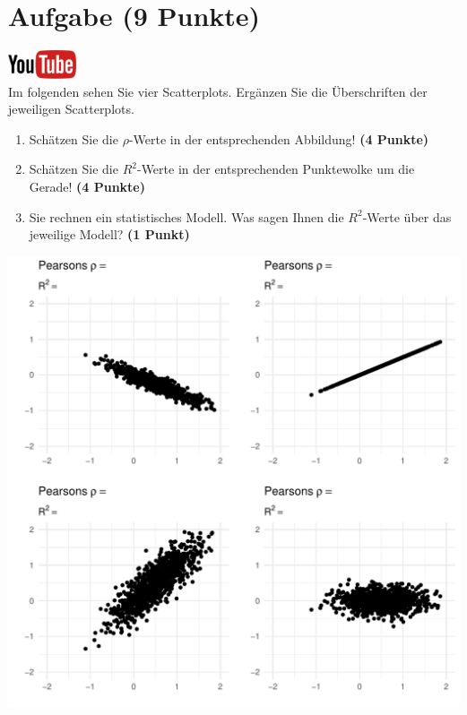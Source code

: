 \documentclass[a4paper, 9pt]{scrartcl}\usepackage[]{graphicx}\usepackage[]{xcolor}
\makeatletter
\def\maxwidth{ %
  \ifdim\Gin@nat@width>\linewidth
    \linewidth
  \else
    \Gin@nat@width
  \fi
}
\makeatother
\begin{document}
 
\clearpage

\section{Aufgabe \hfill (9 Punkte)}

\hfill\href{https://youtu.be/2QJa19ZwLls}{\includegraphics[width =
  2cm]{img/youtube}}\\[1Ex]

Im folgenden sehen Sie vier Scatterplots. Erg{\"a}nzen Sie die {\"U}berschriften
der jeweiligen Scatterplots.


\begin{enumerate}
\item Sch{\"a}tzen Sie die $\rho$-Werte in der entsprechenden
  Abbildung! \textbf{(4 Punkte)}
\item Sch{\"a}tzen Sie die $R^2$-Werte in der entsprechenden
  Punktewolke um die Gerade! \textbf{(4 Punkte)}
\item Sie rechnen ein statistisches Modell. Was sagen Ihnen die $R^2$-Werte
  {\"u}ber das jeweilige Modell? \textbf{(1 Punkt)}
\end{enumerate}




{\centering \includegraphics[width=\maxwidth]{img/correlation-02-1} 

}
\end{document}
